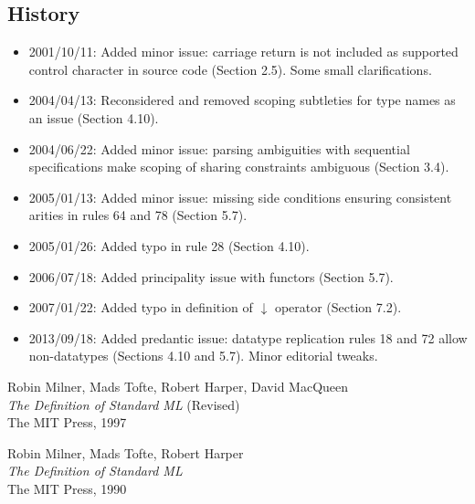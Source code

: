 \documentclass{article}
\begin{document}
\vfill
\pagebreak
\begin{appendix}

\section{History}
\label{history}

\begin{itemize} \setlength{\itemsep}{0em}
\item 2001/10/11: Added minor issue: carriage return is not included as supported control character in source code (Section 2.5). Some small clarifications.
\item 2004/04/13: Reconsidered and removed scoping subtleties for type names as an issue (Section 4.10).
\item 2004/06/22: Added minor issue: parsing ambiguities with sequential specifications make scoping of sharing constraints ambiguous (Section 3.4).
\item 2005/01/13: Added minor issue: missing side conditions ensuring consistent arities in rules 64 and 78 (Section 5.7).
\item 2005/01/26: Added typo in rule 28 (Section 4.10).
\item 2006/07/18: Added principality issue with functors (Section 5.7).
\item 2007/01/22: Added typo in definition of $\downarrow$ operator (Section 7.2).
\item 2013/09/18: Added predantic issue: datatype replication rules 18 and 72 allow non-datatypes (Sections 4.10 and 5.7). Minor editorial tweaks.
\end{itemize}


\begin{thebibliography}{MTHM97}

Robin Milner, Mads Tofte, Robert Harper, David MacQueen \\
{\it The Definition of Standard ML} (Revised) \\
The MIT Press, 1997

Robin Milner, Mads Tofte, Robert Harper \\
{\it The Definition of Standard ML} \\
The MIT Press, 1990


\end{thebibliography}
\end{appendix}
\end{document}
